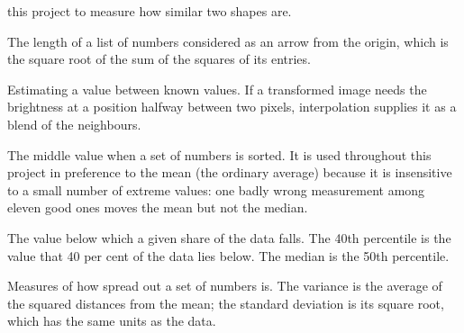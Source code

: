 \begin{description}[style=nextline,leftmargin=1.4em]
        this project to measure how similar two shapes are.
  \item[Norm] The length of a list of numbers considered as an arrow from the
        origin, which is the square root of the sum of the squares of its
        entries.
  \item[Interpolation] Estimating a value between known values. If a
        transformed image needs the brightness at a position halfway between
        two pixels, interpolation supplies it as a blend of the neighbours.
  \item[Median] The middle value when a set of numbers is sorted. It is used
        throughout this project in preference to the mean (the ordinary
        average) because it is insensitive to a small number of extreme
        values: one badly wrong measurement among eleven good ones moves the
        mean but not the median.
  \item[Percentile] The value below which a given share of the data falls.
        The 40th percentile is the value that 40 per cent of the data lies
        below. The median is the 50th percentile.
  \item[Variance and standard deviation] Measures of how spread out a set of
        numbers is. The variance is the average of the squared distances from
        the mean; the standard deviation is its square root, which has the
        same units as the data.
\end{description}

